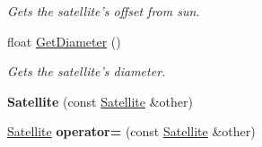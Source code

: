 \begin{DoxyCompactItemize}
\begin{DoxyCompactList}\small\item\em Gets the satellite's offset from sun. \end{DoxyCompactList}\item 
\hypertarget{class_satellite_a563b9bb0e55a27bcb7ac9f134408711a}{float \hyperlink{class_satellite_a563b9bb0e55a27bcb7ac9f134408711a}{Get\-Diameter} ()}\label{class_satellite_a563b9bb0e55a27bcb7ac9f134408711a}

\begin{DoxyCompactList}\small\item\em Gets the satellite's diameter. \end{DoxyCompactList}\item 
\hypertarget{class_satellite_a3c1f0d849c8885f0b524a64ea478e2eb}{{\bfseries Satellite} (const \hyperlink{class_satellite}{Satellite} \&other)}\label{class_satellite_a3c1f0d849c8885f0b524a64ea478e2eb}

\item 
\hypertarget{class_satellite_a7fbf21c092b5c43a5cd2db41aa5a78f9}{\hyperlink{class_satellite}{Satellite} {\bfseries operator=} (const \hyperlink{class_satellite}{Satellite} \&other)}\label{class_satellite_a7fbf21c092b5c43a5cd2db41aa5a78f9}

\end{DoxyCompactItemize}
